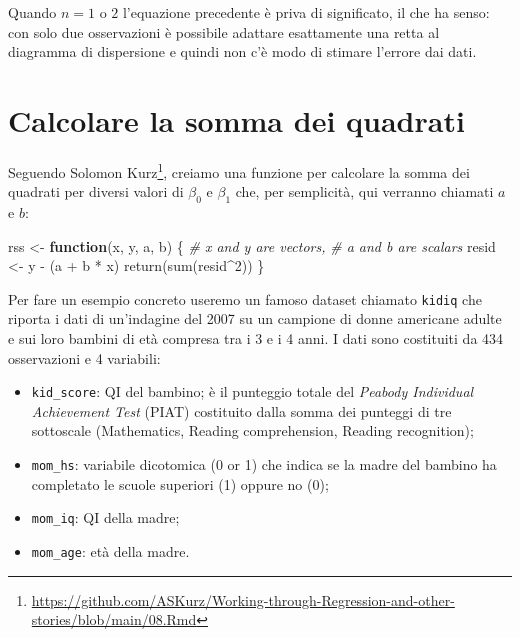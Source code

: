 \documentclass[
  11pt,
]{krantz}
\makeatletter
\newenvironment{Shaded}{\begin{snugshade}}{\end{snugshade}}
\newcommand{\CommentTok}[1]{\textcolor[rgb]{0.37,0.37,0.37}{\textit{#1}}}
\newcommand{\ControlFlowTok}[1]{\textcolor[rgb]{0.27,0.27,0.27}{\textbf{#1}}}
\newcommand{\DecValTok}[1]{\textcolor[rgb]{0.06,0.06,0.06}{#1}}
\newcommand{\FunctionTok}[1]{\textcolor[rgb]{0,0,0}{#1}}
\newcommand{\NormalTok}[1]{#1}
\newcommand{\OtherTok}[1]{\textcolor[rgb]{0.37,0.37,0.37}{#1}}
\newcommand{\SpecialCharTok}[1]{\textcolor[rgb]{0,0,0}{#1}}
\providecommand{\tightlist}{%
  \setlength{\itemsep}{0pt}\setlength{\parskip}{0pt}}
\renewcommand{\href}[2]{#2\footnote{\url{#1}}}
\newenvironment{kframe}{%
\medskip{}
\setlength{\fboxsep}{.8em}
 \def\at@end@of@kframe{}%
 \ifinner\ifhmode%
  \def\at@end@of@kframe{\end{minipage}}%
  \begin{minipage}{\columnwidth}%
 \fi\fi%
 \def\FrameCommand##1{\hskip\@totalleftmargin \hskip-\fboxsep
 \colorbox{shadecolor}{##1}\hskip-\fboxsep
     \hskip-\linewidth \hskip-\@totalleftmargin \hskip\columnwidth}%
 \MakeFramed {\advance\hsize-\width
   \@totalleftmargin\z@ \linewidth\hsize
   \@setminipage}}%
 {\par\unskip\endMakeFramed%
 \at@end@of@kframe}
\renewenvironment{Shaded}{\begin{kframe}}{\end{kframe}}
\theoremstyle{definition}
\theoremstyle{definition}
\theoremstyle{definition}
\theoremstyle{definition}
\theoremstyle{remark}
\makeatother
\begin{document}
Quando \(n = 1\) o \(2\) l'equazione precedente è priva di significato, il che ha senso: con solo due osservazioni è possibile adattare esattamente una retta al diagramma di dispersione e quindi non c'è modo di stimare l'errore dai dati.

\hypertarget{calcolare-la-somma-dei-quadrati}{%
\section{Calcolare la somma dei quadrati}\label{calcolare-la-somma-dei-quadrati}}

Seguendo \href{https://github.com/ASKurz/Working-through-Regression-and-other-stories/blob/main/08.Rmd}{Solomon Kurz}, creiamo una funzione per calcolare la somma dei quadrati per diversi valori di \(\beta_0\) e \(\beta_1\) che, per semplicità, qui verranno chiamati \(a\) e \(b\):

\begin{Shaded}
\begin{Highlighting}[]
\NormalTok{rss }\OtherTok{\textless{}{-}} \ControlFlowTok{function}\NormalTok{(x, y, a, b) \{}
  \CommentTok{\# x and y are vectors,}
  \CommentTok{\# a and b are scalars}
\NormalTok{  resid }\OtherTok{\textless{}{-}}\NormalTok{ y }\SpecialCharTok{{-}}\NormalTok{ (a }\SpecialCharTok{+}\NormalTok{ b }\SpecialCharTok{*}\NormalTok{ x)}
  \FunctionTok{return}\NormalTok{(}\FunctionTok{sum}\NormalTok{(resid}\SpecialCharTok{\^{}}\DecValTok{2}\NormalTok{))}
\NormalTok{\}}
\end{Highlighting}
\end{Shaded}

Per fare un esempio concreto useremo un famoso dataset chiamato \texttt{kidiq} \citep{gelman2020regression} che riporta i dati di un'indagine del 2007 su un campione di donne americane adulte e sui loro bambini di età compresa tra i 3 e i 4 anni. I dati sono costituiti da 434 osservazioni e 4 variabili:

\begin{itemize}
\tightlist
\item
  \texttt{kid\_score}: QI del bambino; è il punteggio totale del \emph{Peabody Individual Achievement Test} (PIAT) costituito dalla somma dei punteggi di tre sottoscale (Mathematics, Reading comprehension, Reading recognition);
\item
  \texttt{mom\_hs}: variabile dicotomica (0 or 1) che indica se la madre del bambino ha completato le scuole superiori (1) oppure no (0);
\item
  \texttt{mom\_iq}: QI della madre;
\item
  \texttt{mom\_age}: età della madre.
\end{itemize}
\end{document}
